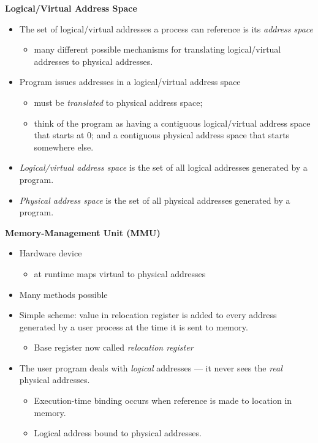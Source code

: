 \documentclass[11pt,a4paper]{article}
\begin{document}
\textbf{Logical/Virtual Address Space}
\begin{itemize}
    \item The set of logical/virtual addresses a process can reference is its
        \emph{address space}
        \begin{itemize}
            \item many different possible mechanisms for translating logical/virtual
                addresses to physical addresses.
        \end{itemize}
    \item Program issues addresses in a logical/virtual address space
        \begin{itemize}
            \item must be \emph{translated} to physical address space;
            \item think of the program as having a contiguous logical/virtual address
                space that starts at 0;
                and a contiguous physical address space that starts somewhere else.
        \end{itemize}
    \item \emph{Logical/virtual address space} is the set of all logical addresses
        generated by a program.
    \item \emph{Physical address space} is the set of all physical addresses generated
        by a program.
\end{itemize}

\textbf{Memory-Management Unit (MMU)}
\begin{itemize}
    \item Hardware device
        \begin{itemize}
            \item at runtime maps virtual to physical addresses
        \end{itemize}
    \item Many methods possible
    \item Simple scheme: value in relocation register is added to every address generated by
        a user process at the time it is sent to memory.
        \begin{itemize}
            \item Base register now called \emph{relocation register}
        \end{itemize}
    \item The user program deals with \emph{logical} addresses --- it never sees the
        \emph{real} physical addresses.
        \begin{itemize}
            \item Execution-time binding occurs when reference is made to location in
                memory.
            \item Logical address bound to physical addresses.
        \end{itemize}
\end{itemize}
\end{document}
